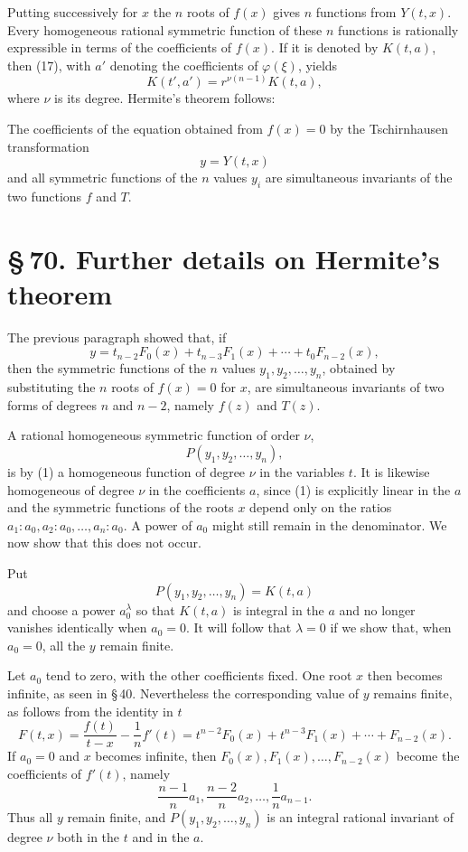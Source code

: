 \documentclass[11pt]{article}
\providecommand{\sect}[2]{\section*{\S\,#1. #2}}
\begin{document}
Putting successively for $x$ the $n$ roots of $f(x)$ gives $n$ functions from $Y(t,x)$. Every homogeneous rational symmetric function of these $n$ functions is rationally expressible in terms of the coefficients of $f(x)$. If it is denoted by $K(t,a)$, then (17), with $a'$ denoting the coefficients of $\varphi(\xi)$, yields
\begin{equation}
 K(t',a')=r^{\nu(n-1)}K(t,a),
\tag{18}
\end{equation}
where $\nu$ is its degree. Hermite's theorem follows:

The coefficients of the equation obtained from $f(x)=0$ by the Tschirnhausen transformation
\[
 y=Y(t,x)
\]
and all symmetric functions of the $n$ values $y_i$ are simultaneous invariants of the two functions $f$ and $T$.

\sect{70}{Further details on Hermite's theorem}

The previous paragraph showed that, if
\begin{equation}
 y=t_{n-2}F_0(x)+t_{n-3}F_1(x)+\cdots+t_0F_{n-2}(x),
\tag{1}
\end{equation}
then the symmetric functions of the $n$ values $y_1,y_2,\ldots,y_n$, obtained by substituting the $n$ roots of $f(x)=0$ for $x$, are simultaneous invariants of two forms of degrees $n$ and $n-2$, namely $f(z)$ and $T(z)$.

A rational homogeneous symmetric function of order $\nu$,
\[
 P(y_1,y_2,
\ldots,y_n),
\]
is by (1) a homogeneous function of degree $\nu$ in the variables $t$. It is likewise homogeneous of degree $\nu$ in the coefficients $a$, since (1) is explicitly linear in the $a$ and the symmetric functions of the roots $x$ depend only on the ratios $a_1:a_0,a_2:a_0,
\ldots,a_n:a_0$. A power of $a_0$ might still remain in the denominator. We now show that this does not occur.

Put
\[
 P(y_1,y_2,\ldots,y_n)=K(t,a)
\]
and choose a power $a_0^\lambda$ so that $K(t,a)$ is integral in the $a$ and no longer vanishes identically when $a_0=0$. It will follow that $\lambda=0$ if we show that, when $a_0=0$, all the $y$ remain finite.

Let $a_0$ tend to zero, with the other coefficients fixed. One root $x$ then becomes infinite, as seen in \S\,40. Nevertheless the corresponding value of $y$ remains finite, as follows from the identity in $t$
\begin{equation}
 F(t,x)=\frac{f(t)}{t-x}-\frac1n f'(t)=t^{n-2}F_0(x)+t^{n-3}F_1(x)+\cdots+F_{n-2}(x).
\tag{2}
\end{equation}
If $a_0=0$ and $x$ becomes infinite, then $F_0(x),F_1(x),\ldots,F_{n-2}(x)$ become the coefficients of $f'(t)$, namely
\[
 \frac{n-1}{n}a_1,
 \frac{n-2}{n}a_2,
 \ldots,
 \frac1n a_{n-1}.
\]
Thus all $y$ remain finite, and $P(y_1,y_2,\ldots,y_n)$ is an integral rational invariant of degree $\nu$ both in the $t$ and in the $a$.
\end{document}
